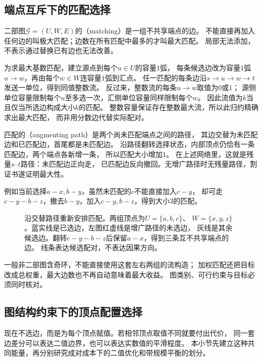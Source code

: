 \subsection{端点互斥下的匹配选择}

二部图\(\mathcal G=(U,W,E)\)的（matching）是一组不共享端点的边。
不能直接再加入任何边的叫极大匹配；边数在所有匹配中最多的才叫最大匹配。
局部无法添加，不表示通过替换已有边也无法改善。

为求最大基数匹配，建立源点到每个\(u\in U\)的容量\(1\)弧，
每条候选边改为容量\(1\)弧\(u\to w\)，再由每个\(w\in W\)连容量\(1\)弧到汇点。
任一匹配的每条边沿\(s\to u\to w\to t\)发送一单位，得到同值整数流。
反过来，整数流的每条\(u\to w\)取值为\(0\)或\(1\)；
源侧单位容量限制每个\(u\)至多选一次，汇侧单位容量同样限制每个\(w\)。
因此流值为\(k\)当且仅当所选边构成大小\(k\)的匹配。
整数容量保证存在整数最大流，所以此归约精确求出最大匹配，
而非用分数边代替实际配对。

匹配的（augmenting path）是两个尚未匹配端点之间的路径，
其边交替为未匹配边和已匹配边，首尾都是未匹配边。
沿路径翻转选择状态，内部顶点仍恰有一条匹配边，两个端点各新增一条，
所以匹配大小增加\(1\)。
在上述网络里，这就是残量\(s\)--\(t\)路径：未匹配边正向走，
已匹配边反向撤回。无增广路径时无残量路径，割证书遂证明最大性。

例如当前选择\(a-x,b-y\)，虽然未匹配的\(c\)不能直接加入\(c-y\)，
却可走\(c-y-b-z\)，撤去\(b-y\)，加入\(c-y,b-z\)，得到大小\(3\)的匹配。

\begin{figure}[htbp]
  \centering
  
  \caption{沿交替路径重新安排匹配。两组顶点为\(U=\{a,b,c\}\)、
  \(W=\{x,y,z\}\)。蓝实线是已选边，左图红虚线是增广路径的未选边，
  灰线是其余候选边。翻转\(c-y-b-z\)后保留\(a-x\)，得到三条互不共享端点的边。
  线条表达候选配对，不表达因果方向。}
  \label{fig:graph-theory-matching-augmentation}
\end{figure}

一般非二部图含奇环，不能直接使用这套左右两组的流构造；
加权匹配还把目标改成总权重，最大边数也不再自动意味着最大收益。
图类别、可行约束与目标必须同时核对。

\subsection{图结构约束下的顶点配置选择}
\label{sec:graph-theory-spectrum-discrete-symmetry}
\label{sec:graph-theory-vertex-configuration}

现在不选边，而是为每个顶点赋值。若相邻顶点取值不同就要付出代价，
同一套边差分可以表达二值边界，也可以表达实数值的平滑程度。
本小节先建立这种共同能量，再分别研究成对成本下的二值优化和带规模平衡的划分。

